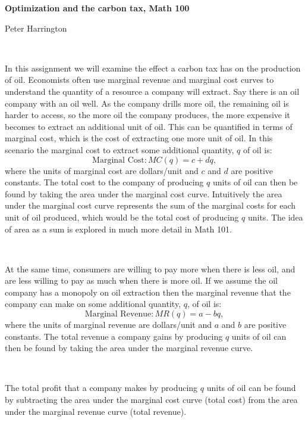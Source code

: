 \documentclass[answers]{exam}
\begin{document}
\large{\textbf{Optimization and the carbon tax, Math 100}}

Peter Harrington

\normalsize
\hrulefill

\

In this assignment we will examine the effect a carbon tax has on the production of oil. Economists often use marginal revenue and marginal cost curves to understand the quantity of a resource a company will extract. Say there is an oil company with an oil well. As the company drills more oil, the remaining oil is harder to access, so the more oil the company produces, the more expensive it becomes to extract an additional unit of oil. This can be quantified in terms of marginal cost, which is the cost of extracting one more unit of oil. In this scenario the marginal cost to extract some additional quantity, $q$ of oil is: \[\text{Marginal Cost}: MC(q)= c+dq,\] where the units of marginal cost are dollars/unit and $c$ and $d$ are positive constants. The total cost to the company of producing $q$ units of oil can then be found by taking the area under the marginal cost curve. Intuitively the area under the marginal cost curve represents the sum of the marginal costs for each unit of oil produced, which would be the total cost of producing $q$ units. The idea of area as a sum is explored in much more detail in Math 101.

\

At the same time, consumers are willing to pay more when there is less oil, and are less willing to pay as much when there is more oil. If we assume the oil company has a monopoly on oil extraction then the marginal revenue that the company can make on some additional quantity, $q$, of oil is: \[\text{Marginal Revenue}: MR(q)=a-bq,\] where the units of marginal revenue are dollars/unit and $a$ and $b$ are positive constants. The total revenue a company gains by producing $q$ units of oil can then be found by taking the area under the marginal revenue curve. 


\

The total profit that a company makes by producing $q$ units of oil can be found by subtracting the area under the marginal cost curve (total cost) from the area under the marginal revenue curve (total revenue).

\
\end{document}

